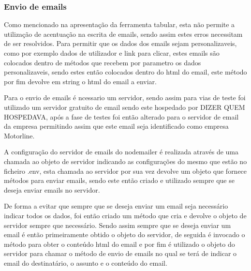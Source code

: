 \subsubsection{Envio de emails}
Como mencionado na apresentação da ferramenta tabular, esta não permite a utilização de acentuação na escrita de emails, sendo assim estes erros necessitam de ser resolvidos. Para permitir que os dados dos emails sejam personalizaveis, como por exemplo dados de utilizador e link para clicar, estes emails são colocados dentro de métodos que recebem por parametro os dados personalizaveis, sendo estes então colocados dentro do html do email, este método por fim devolve em string o html do email a enviar.

Para o envio de emails é ncessario um servidor, sendo assim para vias de teste foi utilizado um servidor gratuito de email sendo este hospedado por DIZER QUEM HOSPEDAVA, após a fase de testes foi então alterado para o servidor de email da empresa permitindo assim que este email seja identificado como empresa Motorline.

A configuração do servidor de emails do nodemailer é realizada através de uma chamada ao objeto 
de servidor indicando as configurações do mesmo que estão no ficheiro .env, esta chamada ao servidor por sua vez devolve um objeto que fornece métodos para enviar emails, sendo este então criado e utilizado sempre que se deseja enviar emails no servidor.


De forma a evitar que sempre que se deseja enviar um email seja necessário indicar todos os dados, foi então criado um método que cria e devolve o objeto de servidor sempre que necessário. Sendo assim sempre que se deseja enviar um email é então primeiramente obtido o objeto do servidor, de seguida é invocado o método para obter o conteúdo html do email e por fim é utilizado o objeto do servidor para chamar o método de envio de emails no qual se terá de indicar o email do destinatário, o assunto e o conteúdo do email.
